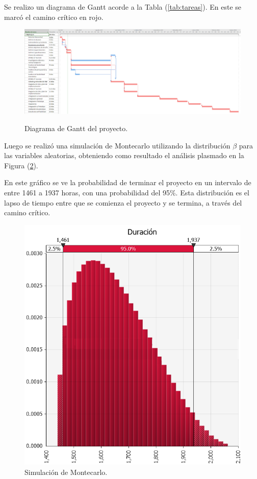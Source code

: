 Se realizo un diagrama de Gantt acorde a la Tabla (\ref{tab:tareas}). En este se marcó el camino crítico en rojo.
\begin{figure}[H]
	\centering
	\includegraphics[width=1\linewidth]{ImagenesFactibilidad/project}
	\label{fig:gantt}
	\caption{Diagrama de Gantt del proyecto.}
\end{figure}

Luego se realizó una simulación de Montecarlo utilizando la distribución $\beta$ para las variables aleatorias, obteniendo como resultado el análisis plasmado en la Figura (\ref{fig:montecarlo_tiempos}).

En este gráfico se ve la probabilidad de terminar el proyecto en un intervalo de entre 1461 a 1937 horas, con una probabilidad del 95\%. Esta distribución es el lapso de tiempo entre que se comienza el proyecto y se termina, a través del camino crítico.

\begin{figure}[H]
	\centering
	\includegraphics[width=0.5\linewidth]{ImagenesFactibilidad/montecarlo}
	\caption{Simulación de Montecarlo.}	
	\label{fig:montecarlo_tiempos}
\end{figure}


